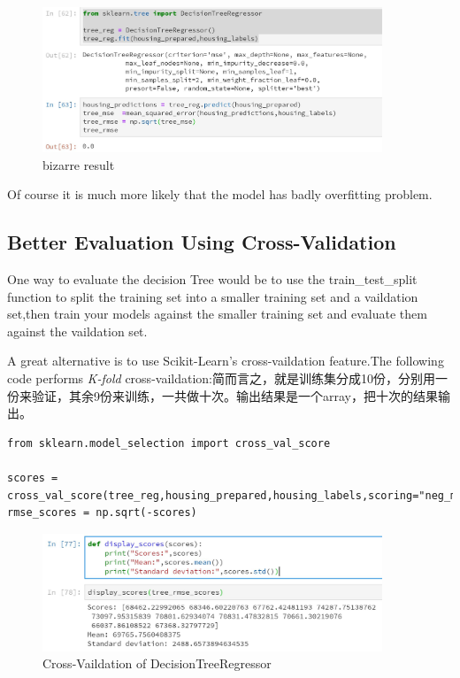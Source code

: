 \documentclass[UTF8]{ctexart}
\begin{document}
\begin{figure}[H]
\centering
\includegraphics[width = 4in]{treeregressorJPG.JPG}
\caption{bizarre result}
\end{figure}


Of course it is much more likely that the model has badly overfitting problem.

\subsection{Better Evaluation Using Cross-Validation}

One way to evaluate the decision Tree would be to use the train\_test\_split function to split the training set into a smaller training set and a vaildation set,then train your models against the smaller training set and evaluate them against the vaildation set.

A great alternative is to use Scikit-Learn's cross-vaildation feature.The following code performs \emph{K-fold} cross-vaildation:简而言之，就是训练集分成10份，分别用一份来验证，其余9份来训练，一共做十次。输出结果是一个array，把十次的结果输出。

\begin{lstlisting}
from sklearn.model_selection import cross_val_score

scores = cross_val_score(tree_reg,housing_prepared,housing_labels,scoring="neg_mean_squared_error",cv=10)
rmse_scores = np.sqrt(-scores)
\end{lstlisting} 

\begin{figure}[H]
\centering
\includegraphics[width = 4in]{cross_val.JPG}
\caption{Cross-Vaildation of DecisionTreeRegressor}
\end{figure}
\end{document}
